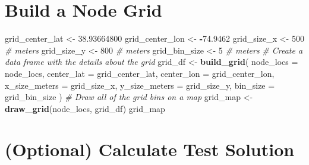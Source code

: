 \documentclass[
]{book}
\newenvironment{Shaded}{\begin{snugshade}}{\end{snugshade}}
\newcommand{\AttributeTok}[1]{\textcolor[rgb]{0.13,0.29,0.53}{#1}}
\newcommand{\CommentTok}[1]{\textcolor[rgb]{0.56,0.35,0.01}{\textit{#1}}}
\newcommand{\DecValTok}[1]{\textcolor[rgb]{0.00,0.00,0.81}{#1}}
\newcommand{\FloatTok}[1]{\textcolor[rgb]{0.00,0.00,0.81}{#1}}
\newcommand{\FunctionTok}[1]{\textcolor[rgb]{0.13,0.29,0.53}{\textbf{#1}}}
\newcommand{\NormalTok}[1]{#1}
\newcommand{\OtherTok}[1]{\textcolor[rgb]{0.56,0.35,0.01}{#1}}
\newcommand{\SpecialCharTok}[1]{\textcolor[rgb]{0.81,0.36,0.00}{\textbf{#1}}}
\begin{document}
\section{Build a Node Grid}\label{build-a-node-grid}

\begin{Shaded}
\begin{Highlighting}[]
\NormalTok{grid\_center\_lat }\OtherTok{\textless{}{-}} \FloatTok{38.93664800}
\NormalTok{grid\_center\_lon }\OtherTok{\textless{}{-}} \SpecialCharTok{{-}}\FloatTok{74.9462}
\NormalTok{grid\_size\_x }\OtherTok{\textless{}{-}} \DecValTok{500} \CommentTok{\# meters}
\NormalTok{grid\_size\_y }\OtherTok{\textless{}{-}} \DecValTok{800} \CommentTok{\# meters}
\NormalTok{grid\_bin\_size }\OtherTok{\textless{}{-}} \DecValTok{5} \CommentTok{\# meters}
\CommentTok{\# Create a data frame with the details about the grid}
\NormalTok{grid\_df }\OtherTok{\textless{}{-}} \FunctionTok{build\_grid}\NormalTok{(}
  \AttributeTok{node\_locs =}\NormalTok{ node\_locs,}
  \AttributeTok{center\_lat =}\NormalTok{ grid\_center\_lat,}
  \AttributeTok{center\_lon =}\NormalTok{ grid\_center\_lon,}
  \AttributeTok{x\_size\_meters =}\NormalTok{ grid\_size\_x,}
  \AttributeTok{y\_size\_meters =}\NormalTok{ grid\_size\_y,}
  \AttributeTok{bin\_size =}\NormalTok{ grid\_bin\_size}
\NormalTok{)}
\CommentTok{\# Draw all of the grid bins on a map}
\NormalTok{grid\_map }\OtherTok{\textless{}{-}} \FunctionTok{draw\_grid}\NormalTok{(node\_locs, grid\_df)}
\NormalTok{grid\_map}
\end{Highlighting}
\end{Shaded}

\section{(Optional) Calculate Test Solution}\label{optional-calculate-test-solution}
\end{document}
